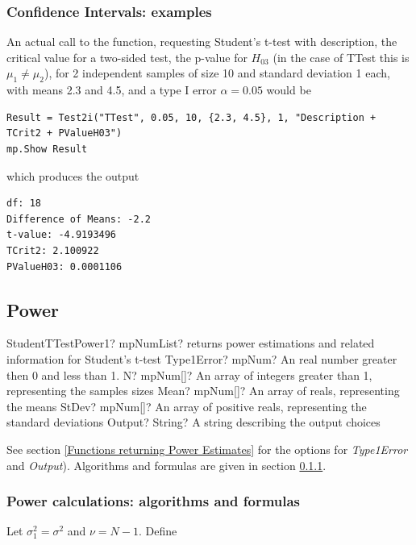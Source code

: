 

\subsubsection{Confidence Intervals: examples}
An actual call to the function, requesting Student's t-test with description, the critical value for a two-sided test, the p-value for $H_{03}$ (in the case of \textsf{TTest} this is $\mu_1 \neq \mu_2$), for 2 independent samples of size 10 and standard deviation 1 each, with means 2.3 and 4.5, and a type I error $\alpha=0.05$ would be

\begin{lstlisting}
Result = Test2i("TTest", 0.05, 10, {2.3, 4.5}, 1, "Description + TCrit2 + PValueH03")
mp.Show Result
\end{lstlisting}
which produces the output

\begin{verbatim}
df: 18
Difference of Means: -2.2
t-value: -4.9193496
TCrit2: 2.100922
PValueH03: 0.0001106
\end{verbatim}





\newpage
\subsection{Power}

\begin{mpFunctionsExtract}
	\mpFunctionFiveNotImplemented
	{StudentTTestPower1? mpNumList? returns power estimations and related information for Student's t-test}
	{Type1Error? mpNum? An real number greater then 0 and less than 1.}
	{N? mpNum[]? An array of integers greater than 1, representing the samples sizes}
	{Mean? mpNum[]? An array of reals, representing the means}
	{StDev? mpNum[]? An array of positive reals, representing the standard deviations}
	{Output? String? A string describing the output choices}
\end{mpFunctionsExtract}

\vspace{0.3cm}
See section \ref{Functions returning Power Estimates} for the options for {\itshape\sffamily Type1Error} and {\itshape\sffamily Output}). Algorithms and formulas are given in section \ref{1SampleTTest_Power}.


\subsubsection{Power calculations: algorithms and formulas}
\label{1SampleTTest_Power}
Let $\sigma_1^2 = \sigma^2$ and $\nu=N-1$. Define

